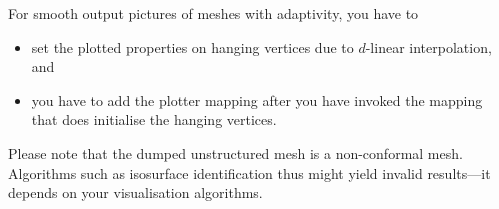 \begin{remark}
  For smooth output pictures of meshes with adaptivity, you have to 
  \begin{itemize}
    \item set the plotted properties on hanging vertices due to $d$-linear
    interpolation, and
    \item you have to add the plotter mapping after you have invoked the mapping
    that does initialise the hanging vertices.
  \end{itemize}
\end{remark}


\noindent
Please note that the dumped unstructured mesh is a non-conformal mesh. 
Algorithms such as isosurface identification thus might yield invalid
results---it depends on your visualisation algorithms.


